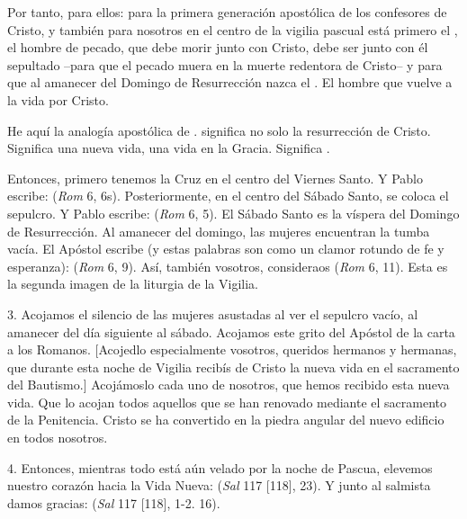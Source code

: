 \begin{body}
Por tanto, para ellos: para la primera generación apostólica de los confesores de Cristo, y también para nosotros en el centro de la vigilia pascual está primero el , el hombre de pecado, que debe morir junto con Cristo, debe ser junto con él sepultado –para que el pecado muera en la muerte redentora de Cristo– y para que al amanecer del Domingo de Resurrección nazca el . El hombre que vuelve a la vida por Cristo. 

He aquí la analogía apostólica de .  significa no solo la resurrección de Cristo. Significa una nueva vida, una vida en la Gracia. Significa . 

Entonces, primero tenemos la Cruz en el centro del Viernes Santo. Y Pablo escribe:  (\textit{Rom} 6, 6s). Posteriormente, en el centro del Sábado Santo, se coloca el sepulcro. Y Pablo escribe:  (\textit{Rom} 6, 5). El Sábado Santo es la víspera del Domingo de Resurrección. Al amanecer del domingo, las mujeres encuentran la tumba vacía. El Apóstol escribe (y estas palabras son como un clamor rotundo de fe y esperanza):  (\textit{Rom} 6, 9). Así, también vosotros, consideraos  (\textit{Rom} 6, 11). Esta es la segunda imagen de la liturgia de la Vigilia. 

3. Acojamos el silencio de las mujeres asustadas al ver el sepulcro vacío, al amanecer del día siguiente al sábado. Acojamos este grito del Apóstol de la carta a los Romanos. [Acojedlo especialmente vosotros, queridos hermanos y hermanas, que durante esta noche de Vigilia recibís de Cristo la nueva vida en el sacramento del Bautismo.] Acojámoslo cada uno de nosotros, que hemos recibido esta nueva vida. Que lo acojan todos aquellos que se han renovado mediante el sacramento de la Penitencia. Cristo se ha convertido en la piedra angular del nuevo edificio en todos nosotros. 

4. Entonces, mientras todo está aún velado por la noche de Pascua, elevemos nuestro corazón hacia la Vida Nueva:  (\textit{Sal} 117 [118], 23). Y junto al salmista damos gracias:  (\textit{Sal} 117 [118], 1-2. 16). 


\end{body}

